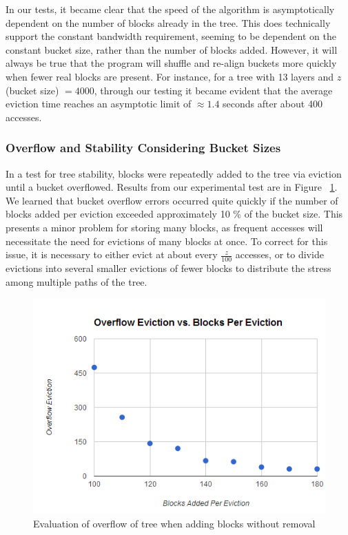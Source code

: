 \documentclass[12pt, oneside]{article}   	%
\begin{document}
In our tests, it became clear that the speed of the algorithm is asymptotically dependent on the number of blocks already in the tree. This does technically support the constant bandwidth requirement, seeming to be dependent on the constant bucket size, rather than the number of blocks added. However, it will always be true that the program will shuffle and re-align buckets more quickly when fewer real blocks are present. For instance,  for a tree with 13 layers and $z$ (bucket size) $= 4000$, through our testing it became evident that the average eviction time reaches an asymptotic limit of $\approx 1.4$ seconds after about 400 accesses.

\subsubsection{Overflow and Stability Considering Bucket Sizes}
In a test for tree stability, blocks were repeatedly added to the tree via eviction until a bucket overflowed. Results from our experimental test are in Figure ~\ref{fig:overflowgraph}. We learned that bucket overflow errors occurred quite quickly if the number of blocks added per eviction exceeded approximately 10 \% of the bucket size. This presents a minor problem for storing many blocks, as frequent accesses will necessitate the need for evictions of many blocks at once. To correct for this issue, it is necessary to either evict at about every $\frac{z}{100}$ accesses, or to divide evictions into several smaller evictions of fewer blocks to distribute the stress among multiple paths of the tree.

\begin{figure}[H]
  \includegraphics[width=\linewidth]{overflowgraph}
  \caption{Evaluation of overflow of tree when adding blocks without removal}
  \label{fig:overflowgraph}
\end{figure}
\end{document}
